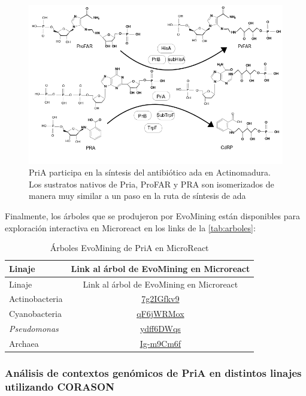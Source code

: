 \documentclass[]{article}
\begin{document}
{\begin{figure}[h!tbp]
\centering
\includegraphics[angle = 0,scale = 0.6]{chapter4/ada.png}
\caption[PriA participa en la síntesis del antibiótico {ada} en {Actinomadura} ]{\footnotesize{PriA participa en la síntesis del antibiótico {ada} en {Actinomadura}. Los sustratos nativos de Pria, ProFAR y PRA son isomerizados de manera muy similar a un paso en la ruta de síntesis de {ada} }}
\label{fig:ada}
\end{figure}

Finalmente, los árboles que se produjeron por EvoMining están
disponibles para exploración interactiva en Microreact en los links de
la \autoref{tab:arboles}:

\begin{longtable}[]{@{}lc@{}}
\caption{Árboles EvoMining de PriA en MicroReact
\label{tab:arboles}}\tabularnewline
\toprule
Linaje & Link al árbol de EvoMining en Microreact\tabularnewline
\midrule
\endfirsthead
\toprule
Linaje & Link al árbol de EvoMining en Microreact\tabularnewline
\midrule
\endhead
Actinobacteria &
\href{https://microreact.org/project/7g2IGfkv9}{7g2IGfkv9}\tabularnewline
Cyanobacteria &
\href{https://microreact.org/project/qF6jWRMox}{qF6jWRMox}\tabularnewline
\emph{Pseudomonas} &
\href{https://microreact.org/project/ydff6DWqs}{ydff6DWqs}\tabularnewline
Archaea &
\href{https://microreact.org/project/Ig-m9Cm6f}{Ig-m9Cm6f}\tabularnewline
\bottomrule
\end{longtable}

\subsubsection{Análisis de contextos genómicos de PriA en distintos
linajes utilizando
CORASON}\label{analisis-de-contextos-genomicos-de-pria-en-distintos-linajes-utilizando-corason}

}
\end{document}
